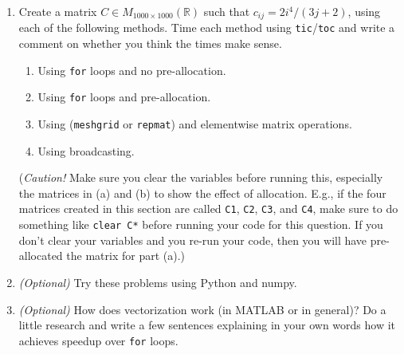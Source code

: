 \documentclass{article}
\begin{document}
\begin{enumerate}
		\item Create a matrix $C\in M_{1000\times 1000}(\mathbb{R})$ such that $c_{ij}=2i^4/(3j+2)$, using each of the following methods. Time each method using \lstinline|tic|/\lstinline|toc| and write a comment on whether you think the times make sense.
		\begin{enumerate}
			\item Using \lstinline|for| loops and no pre-allocation.
			\item Using \lstinline|for| loops and pre-allocation.
			\item Using (\lstinline|meshgrid| or \lstinline|repmat|) and elementwise matrix operations.
			\item Using broadcasting.
		\end{enumerate}
	
		(\textit{Caution!} Make sure you clear the variables before running this, especially the matrices in (a) and (b) to show the effect of allocation. E.g., if the four matrices created in this section are called \lstinline|C1|, \lstinline|C2|, \lstinline|C3|, and \lstinline|C4|, make sure to do something like \lstinline|clear C*| before running your code for this question. If you don't clear your variables and you re-run your code, then you will have pre-allocated the matrix for part (a).)
		
		\item \textit{(Optional)} Try these problems using Python and numpy.
		
		\item \textit{(Optional)} How does vectorization work (in MATLAB or in general)? Do a little research and write a few sentences explaining in your own words how it achieves speedup over \lstinline|for| loops.
	\end{enumerate}
	
\end{document}
